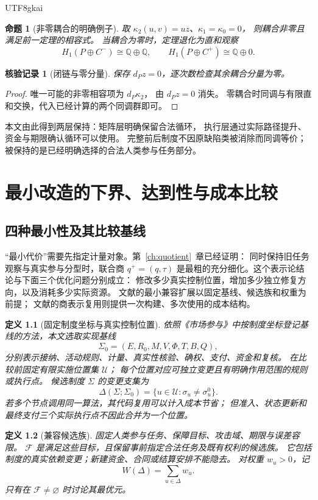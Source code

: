\documentclass[12pt,a4paper,openany]{report}
\newtheorem{definition}{定义}[chapter]
\newtheorem{proposition}{命题}[chapter]
\newtheorem{Certificate}{核验记录}[chapter]
\newcommand{\QQ}{\mathbb Q}
\begin{document}
\begin{CJK*}{UTF8}{gkai}
\begin{proposition}[非零耦合的明确例子]
取 \(\kappa_2(u,v)=u z\)、\(\kappa_1=\kappa_0=0\)，
则耦合非零且满足前一定理的相容式。
当耦合为零时，定理退化为直和观察
\[
H_1(P\oplus C^-)\cong\QQ\oplus\QQ,\qquad
H_1(P\oplus C^+)\cong\QQ\oplus0.
\]
\end{proposition}
\begin{Certificate}[闭链与零分量]
保存 \(d_Pz=0\)，逐次数检查其余耦合分量为零。
\end{Certificate}
\begin{proof}
唯一可能的非零相容项为 \(d_P\kappa_2\)，
由 \(d_Pz=0\) 消失。
零耦合时同调与有限直和交换，代入已经计算的两个同调群即可。
\end{proof}

本文由此得到两层保持：矩阵层明确保留合法循环，
执行层通过实际路径提升、资金与期限确认循环可以使用。
完整前后制度不因原缺陷类被消除而同调等价；
被保持的是已经明确选择的合法人类参与任务部分。

\chapter{最小改造的下界、达到性与成本比较}
\label{ch:minimal}

\section{四种最小性及其比较基线}
“最小代价”需要先指定计量对象。第~\ref{ch:quotient}~章已经证明：
同时保持旧任务观察与真实参与分型时，联合商 \(q^+=(q,\tau)\)
是最粗的充分细化。这个表示论结论与下面三个优化问题分别成立：
修改多少真实控制位置，增加多少独立修复方向，以及消耗多少实际资源。
文献\cite{EMarket}的最小兼容扩展以固定基线、候选族和权重为前提；
文献\cite{GRate}的商表示复用则提供一次构建、多次使用的成本结构。

\begin{definition}[固定制度坐标与真实控制位置]
\label{def:baseline}
依照《市场参与》中按制度坐标登记基线的方法，本文选取实现基线
\[
\Sigma_0=(E,R_0,M,V,\Phi,T,B,Q),
\]
分别表示接纳、活动规则、计量、真实性核验、确权、支付、资金和复核。
在比较前固定有限实施位置集 \(\mathcal U\)；
每个位置对应可独立变更且有明确作用范围的规则或执行点。
候选制度 \(\Sigma\) 的变更支集为
\[
\Delta(\Sigma;\Sigma_0)
=\{u\in\mathcal U:\sigma_u\ne\sigma_u^0\}.
\]
若多个节点调用同一算法，其代码复用可以计入成本节省；
但准入、状态更新和最终支付三个实际执行点不因此合并为一个位置。
\end{definition}

\begin{definition}[兼容候选族]
固定人类参与任务、保障目标、攻击域、期限与误差容限。
\(\mathcal F\) 是满足这些目标，且保留事前指定合法任务及既有权利的候选族。
它包括制度的真实依赖变更；新建资金、合同或结算安排不能隐去。
对权重 \(w_u>0\)，记
\[
W(\Delta)=\sum_{u\in\Delta}w_u.
\]
只有在 \(\mathcal F\ne\varnothing\) 时讨论其最优元。
\end{definition}


\end{CJK*}
\end{document}
